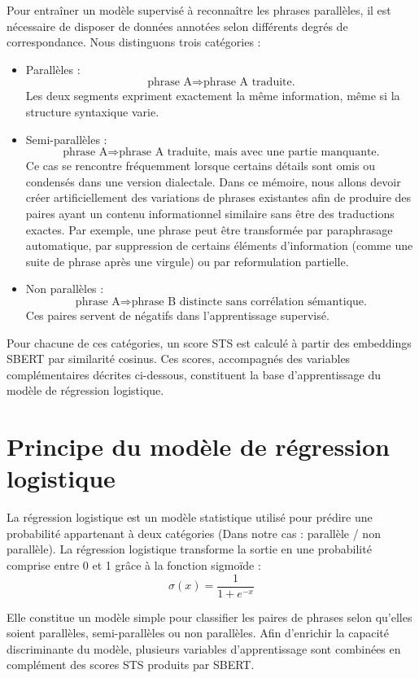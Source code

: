 Pour entraîner un modèle supervisé à reconnaître les phrases parallèles, il est nécessaire de disposer de
données annotées selon différents degrés de correspondance. Nous distinguons trois catégories{ :}

\begin{itemize}
    \item Parallèles{ :}
    \[
    \text{phrase A} \Rightarrow \text{phrase A traduite.}
    \]
    Les deux segments expriment exactement la même information, même si la structure syntaxique varie.
    
    \item Semi-parallèles{ :}
    \[
    \text{phrase A} \Rightarrow \text{phrase A traduite, mais avec une partie manquante.}
    \]
    Ce cas se rencontre fréquemment lorsque certains détails sont omis ou condensés dans une version dialectale.
    Dans ce mémoire, nous allons devoir créer artificiellement des variations de phrases existantes afin
    de produire des paires ayant un contenu informationnel similaire sans être des traductions exactes.
    Par exemple, une phrase peut être transformée par paraphrasage automatique, par suppression de certains
    éléments d’information (comme une suite de phrase après une virgule) ou par reformulation partielle.
    
    \item Non parallèles{ :}
    \[
    \text{phrase A} \Rightarrow \text{phrase B distincte sans corrélation sémantique.}
    \]
    Ces paires servent de négatifs dans l’apprentissage supervisé.
\end{itemize}

Pour chacune de ces catégories, un score STS est calculé à partir des
embeddings SBERT par similarité cosinus. Ces scores, accompagnés des variables complémentaires décrites ci-dessous,
constituent la base d’apprentissage du modèle de régression logistique.

\section{Principe du modèle de régression logistique}

La régression logistique est un modèle statistique utilisé pour prédire une probabilité appartenant à deux
catégories (Dans notre cas{ :} parallèle / non parallèle). La régression logistique transforme la sortie en une
probabilité comprise entre 0 et 1 grâce à la fonction sigmoïde{ :}
\[
\sigma(x) = \frac{1}{1 + e^{-x}}
\]

Elle constitue un modèle simple pour classifier les paires de phrases selon
qu’elles soient parallèles, semi-parallèles ou non parallèles. Afin d'enrichir la capacité discriminante du
modèle, plusieurs variables d'apprentissage sont combinées en complément des scores STS produits par SBERT.

